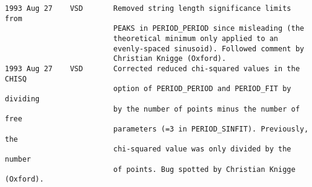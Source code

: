\begin{verbatim}
1993 Aug 27    VSD       Removed string length significance limits from
                         PEAKS in PERIOD_PERIOD since misleading (the 
                         theoretical minimum only applied to an 
                         evenly-spaced sinusoid). Followed comment by
                         Christian Knigge (Oxford). 
1993 Aug 27    VSD       Corrected reduced chi-squared values in the CHISQ 
                         option of PERIOD_PERIOD and PERIOD_FIT by dividing 
                         by the number of points minus the number of free 
                         parameters (=3 in PERIOD_SINFIT). Previously, the 
                         chi-squared value was only divided by the number 
                         of points. Bug spotted by Christian Knigge (Oxford). 
                          
\end{verbatim}


\newpage


